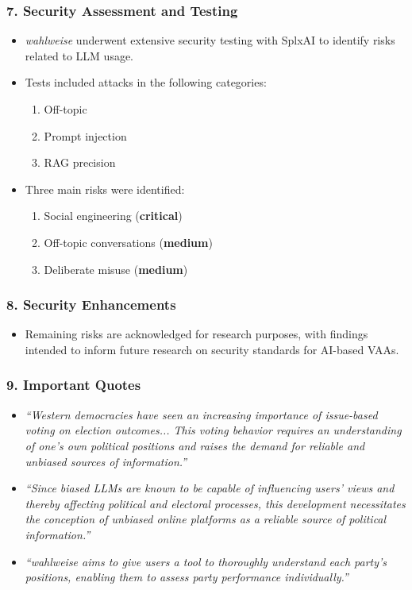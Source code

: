 \documentclass{article}
\begin{document}
\subsubsection*{7. Security Assessment and Testing}
\begin{itemize}
    \item \emph{wahlweise} underwent extensive security testing with SplxAI to identify risks related to LLM usage.
    \item Tests included attacks in the following categories:
    \begin{enumerate}
        \item Off-topic
        \item Prompt injection
        \item RAG precision
    \end{enumerate}
    \item Three main risks were identified:
    \begin{enumerate}
        \item Social engineering (\textbf{critical})
        \item Off-topic conversations (\textbf{medium})
        \item Deliberate misuse (\textbf{medium})
    \end{enumerate}
\end{itemize}

\subsubsection*{8. Security Enhancements}
\begin{itemize}


    \item Remaining risks are acknowledged for research purposes, with findings intended to inform future research on security standards for AI-based VAAs.
\end{itemize}

\subsubsection*{9. Important Quotes}
\begin{itemize}
    \item \emph{“Western democracies have seen an increasing importance of issue-based voting on election outcomes... This voting behavior requires an understanding of one’s own political positions and raises the demand for reliable and unbiased sources of information.”}
    \item \emph{“Since biased LLMs are known to be capable of influencing users’ views and thereby affecting political and electoral processes, this development necessitates the conception of unbiased online platforms as a reliable source of political information.”}

    \item \emph{“\emph{wahlweise} aims to give users a tool to thoroughly understand each party’s positions, enabling them to assess party performance individually.”}
  
\end{itemize}
\end{document}
